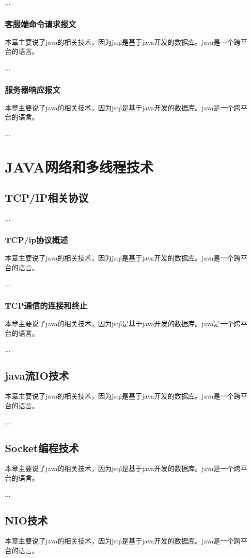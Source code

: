 ...
\subsubsection*{客服端命令请求报文}
本章主要说了java的相关技术，因为jsql是基于java开发的数据库。java是一个跨平台的语言。

...
\subsubsection*{服务器响应报文}
本章主要说了java的相关技术，因为jsql是基于java开发的数据库。java是一个跨平台的语言。



...
\section*{JAVA网络和多线程技术}
\subsection*{TCP/IP相关协议}
...
\subsubsection*{TCP/ip协议概述}
本章主要说了java的相关技术，因为jsql是基于java开发的数据库。java是一个跨平台的语言。

...
\subsubsection*{TCP通信的连接和终止}
本章主要说了java的相关技术，因为jsql是基于java开发的数据库。java是一个跨平台的语言。

...
\subsection*{java流IO技术}
本章主要说了java的相关技术，因为jsql是基于java开发的数据库。java是一个跨平台的语言。

...
\subsection*{Socket编程技术}
本章主要说了java的相关技术，因为jsql是基于java开发的数据库。java是一个跨平台的语言。

...
\subsection*{NIO技术}
本章主要说了java的相关技术，因为jsql是基于java开发的数据库。java是一个跨平台的语言。


